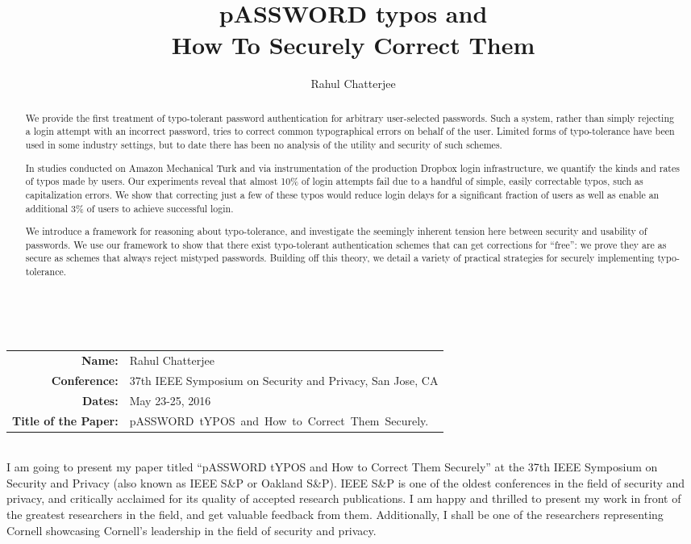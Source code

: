 \documentclass[11pt,a4paper,notitlepage]{article}
\title{pASSWORD typos and\\ How To Securely Correct Them}
\author{Rahul Chatterjee}
\begin{document}
{} \\[4pt]
\begin{tabular}[t]{rl}
{\bf Name:} &Rahul Chatterjee\\
{\bf Conference:}& 37th IEEE Symposium on Security and Privacy, San Jose, CA\\
{\bf Dates:} &May 23-25, 2016\\
{\bf Title of the Paper:}& \mbox{pASSWORD tYPOS and How to Correct Them Securely.}
\end{tabular}
\vspace{0.2in}
\begin{abstract}
  We provide the first treatment of typo-tolerant password
  authentication for arbitrary user-selected passwords. Such a system,
  rather than simply rejecting a login attempt with an incorrect
  password, tries to correct common typographical errors on behalf of
  the user. Limited forms of typo-tolerance have been used in some
  industry settings, but to date there has been no analysis of the
  utility and security of such schemes.

  In studies conducted on Amazon Mechanical Turk and via
  instrumentation of the production Dropbox login infrastructure, we
  quantify the kinds and rates of typos made by users. Our experiments
  reveal that almost 10\% of login attempts fail due to a handful of
  simple, easily correctable typos, such as capitalization errors.  We
  show that correcting just a few of these typos would reduce login
  delays for a significant fraction of users as well as enable an
  additional 3\% of users to achieve successful login.

  We introduce a framework for reasoning about typo-tolerance, and
  investigate the seemingly inherent tension here between security and
  usability of passwords. We use our framework to show that there
  exist typo-tolerant authentication schemes that can get corrections
  for ``free'': we prove they are as secure as schemes that always
  reject mistyped passwords. Building off this theory, we detail a
  variety of practical strategies for securely implementing
  typo-tolerance.
\end{abstract}
\vspace{0.2in}
 \\ I am
going to present my paper titled ``pASSWORD tYPOS and How to Correct
Them Securely'' at the 37th IEEE Symposium on Security and Privacy
(also known as IEEE S\&P or Oakland S\&P).  IEEE S\&P is one of the
oldest conferences in the field of security and privacy, and
critically acclaimed for its quality of accepted research
publications. I am happy and thrilled to present my work in front of
the greatest researchers in the field, and get valuable feedback from
them. Additionally, I shall be one of the researchers representing
Cornell showcasing Cornell's leadership in the field of security and
privacy.
\end{document}
